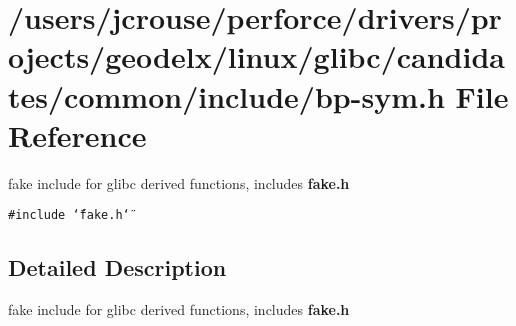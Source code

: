 \section{/users/jcrouse/perforce/drivers/projects/geodelx/linux/glibc/candidates/common/include/bp-sym.h File Reference}
\label{bp-sym_8h}
fake include for glibc derived functions, includes {\bf fake.h} 


{\tt \#include \char`\"{}fake.h\char`\"{}}\par


\subsection{Detailed Description}
fake include for glibc derived functions, includes {\bf fake.h}




